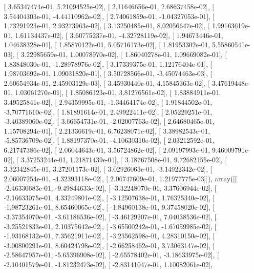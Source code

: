 \documentclass{article}
\begin{document}
       [  3.65347474e-01,   5.21094525e-02],
       [  2.11646656e-01,   2.68637458e-02],
       [  3.54404303e-01,  -4.44110962e-02],
       [  2.74061859e-01,  -1.04327053e-01],
       [  1.73291923e-01,   2.93273963e-02],
       [  3.13250485e-01,   8.02056647e-02],
       [  1.99163619e-01,   1.61134437e-02],
       [  3.60775237e-01,  -4.32728119e-02],
       [  1.94673446e-01,   1.04638328e-01],
       [  1.85870122e-01,   5.05716173e-02],
       [  1.81953302e-01,   5.55860541e-03],
       [  3.22985659e-01,   1.00078970e-02],
       [  1.86040278e-01,   1.09669082e-01],
       [  1.83848030e-01,  -1.28978976e-02],
       [  3.17339375e-01,   1.12176404e-01],
       [  1.98703692e-01,   1.09031820e-01],
       [  3.50728566e-01,  -3.45074463e-03],
       [  2.60654934e-01,   2.45903129e-03],
       [  3.45930440e-01,   4.15845363e-02],
       [  3.47619448e-01,   1.03061270e-01],
       [  1.85086123e-01,   3.81276561e-02],
       [  1.83884911e-01,   3.49525841e-02],
       [  2.94359995e-01,  -1.34464174e-02],
       [  1.91844502e-01,  -3.70771610e-02],
       [  1.81891614e-01,   2.49922411e-02],
       [  2.05229251e-01,  -3.40389060e-02],
       [  3.66654731e-01,  -2.02007763e-02],
       [  2.64680465e-01,   1.15708294e-01],
       [  2.21336619e-01,   6.76238071e-02],
       [  3.38982543e-01,  -5.85736709e-02],
       [  1.88197370e-01,  -4.10630310e-02],
       [  2.03212592e-01,   6.21747386e-02],
       [  2.06044643e-01,   3.56724862e-02],
       [  2.09197993e-01,   9.46009791e-02],
       [  3.37253244e-01,   1.21871439e-01],
       [  3.18767508e-01,   9.72682155e-02],
       [  3.32342845e-01,   3.27201173e-02],
       [  3.02926063e-01,  -3.14922342e-02],
       [  2.06007254e-01,  -4.32393118e-02],
       [  2.06747609e-01,   1.21977775e-03]]), array([[ -2.46330683e-01,  -9.49844633e-02],
       [ -3.32248070e-01,   3.37606944e-02],
       [ -2.16633075e-01,   4.33249801e-02],
       [ -3.12507638e-01,   1.76325340e-02],
       [ -1.98723261e-01,   8.65460065e-02],
       [ -1.84960138e-01,   9.37458020e-02],
       [ -3.37354070e-01,  -3.61186536e-02],
       [ -3.46129207e-01,   7.04038536e-02],
       [ -3.25521833e-01,   2.10375642e-02],
       [ -3.65500242e-01,  -1.67059985e-02],
       [ -1.93168132e-01,   7.35621911e-02],
       [ -3.23562598e-01,   4.28310150e-02],
       [ -3.00800291e-01,   8.60424798e-02],
       [ -2.66258462e-01,   3.73063147e-02],
       [ -2.58647957e-01,  -5.65396908e-02],
       [ -2.65578402e-01,  -3.18633975e-02],
       [ -2.10401579e-01,  -1.81232473e-02],
       [ -2.83141047e-01,   1.10082061e-02],
\end{document}
